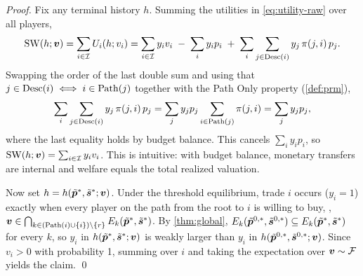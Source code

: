 \begin{proof}
Fix any terminal history $h$. Summing the utilities in \cref{eq:utility-raw} over all players,
\[
\mathrm{SW}(h;{\bm{v}}) = \sum_{i \in \mathcal{I}} U_i(h;v_i) = \sum_{i \in \mathcal{I}} y_i v_i \;-\; \sum_{i} y_i p_i \;+\; \sum_{i} \sum_{j \in \operatorname{Desc}(i)} y_j\, \pi(j,i)\, p_j.
\]
Swapping the order of the last double sum and using that $j \in \operatorname{Desc}(i) \iff i \in \operatorname{Path}(j)$ together with the Path Only property (\cref{def:prm}),
\[
\sum_{i} \sum_{j \in \operatorname{Desc}(i)} y_j\, \pi(j,i)\, p_j = \sum_{j} y_j p_j \sum_{i \in \operatorname{Path}(j)} \pi(j,i) = \sum_{j} y_j p_j,
\]
where the last equality holds by budget balance. This cancels $\sum_i y_i p_i$, so $\mathrm{SW}(h;{\bm{v}}) = \sum_{i \in \mathcal{I}} y_i v_i$. This is intuitive: with budget balance, monetary transfers are internal and welfare equals the total realized valuation.

Now set $h = h(\tilde{{\bm{p}}}^*, \tilde{{\bm{s}}}^*; {\bm{v}})$. Under the threshold equilibrium, trade $i$ occurs ($y_i = 1$) exactly when every player on the path from the root to $i$ is willing to buy, \ie, ${\bm{v}} \in \bigcap_{k \in (\operatorname{Path}(i) \cup \{i\}) \setminus \{r\}} E_k(\tilde{{\bm{p}}}^*, \tilde{{\bm{s}}}^*)$. By \cref{thm:global}, $E_k(\tilde{{\bm{p}}}^{0,*}, \tilde{{\bm{s}}}^{0,*}) \subseteq E_k(\tilde{{\bm{p}}}^*, \tilde{{\bm{s}}}^*)$ for every $k$, so $y_i$ in $h(\tilde{{\bm{p}}}^*, \tilde{{\bm{s}}}^*; {\bm{v}})$ is weakly larger than $y_i$ in $h(\tilde{{\bm{p}}}^{0,*}, \tilde{{\bm{s}}}^{0,*}; {\bm{v}})$. Since $v_i > 0$ with probability 1, summing over $i$ and taking the expectation over ${\bm{v}} \sim \mathcal{F}$ yields the claim.
\qed
\end{proof}
